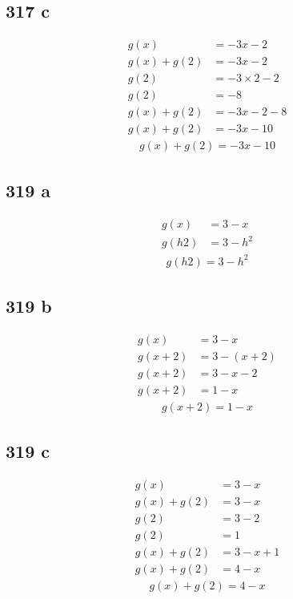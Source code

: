 \documentclass{article}
\begin{document}
    \subsection*{317 c}
    \begin{align*}
        g(x) &= -3x - 2 \\
        g(x) + g(2) &= -3x - 2\\
        g(2) &= -3 \times 2 - 2\\
        g(2) &= -8\\
        g(x) + g(2) &= -3x - 2 -8\\
        g(x) + g(2) &= -3x - 10
    \end{align*}
    \begin{align*}
        \boxed{g(x) + g(2) = -3x - 10}
    \end{align*}

    \subsection*{319 a}
    \begin{align*}
        g(x) &= 3 - x \\
        g(h2) &= 3 - h^2
    \end{align*}
    \begin{align*}
        \boxed{g(h2) = 3 - h^2}
    \end{align*}

    \subsection*{319 b}
    \begin{align*}
        g(x) &= 3 - x \\
        g(x + 2) &= 3 - (x + 2)\\
        g(x + 2) &= 3 -x - 2\\
        g(x + 2) &= 1 - x
    \end{align*}
    \begin{align*}
        \boxed{g(x + 2) = 1 - x}
    \end{align*}

    \subsection*{319 c}
    \begin{align*}
        g(x) &= 3 - x \\
        g(x) + g(2) &=  3 - x\\
        g(2) &= 3 - 2\\
        g(2) &= 1\\
        g(x) + g(2) &= 3 - x + 1\\
        g(x) + g(2) &= 4 - x
    \end{align*}
    \begin{align*}
        \boxed{g(x) + g(2) = 4 - x}
    \end{align*}
\end{document}
